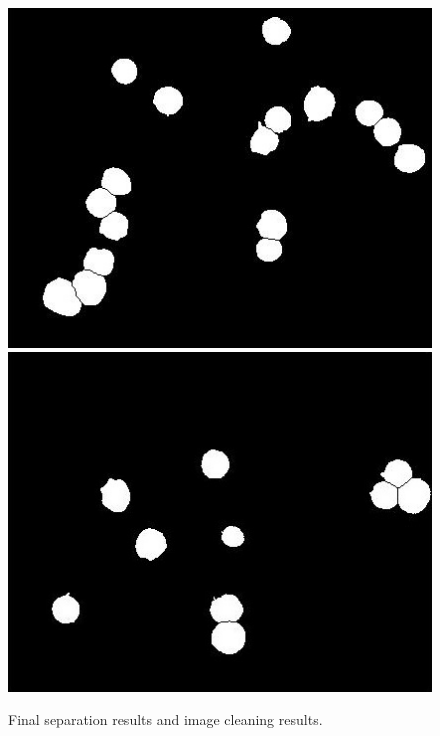 {\begin{figure}[!htbp]
		\includegraphics[height=0.23\textheight]{images/Fig15-1}
		\includegraphics[height=0.23\textheight]{images/Fig15-2}
		\caption[Image cleaning.]{\label{fig:example13}Final separation results and image cleaning results.}
	\end{figure}
	
}
